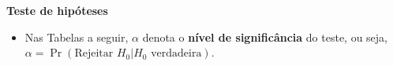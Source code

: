 \documentclass[10pt]{article}%
\renewcommand{\ra}[1]{\renewcommand{\arraystretch}{#1}}
\begin{document}
%
%
%

\textbf{Teste de hipóteses}

\begin{itemize}
\item Nas Tabelas a seguir, $\alpha$ denota o {\bf nível de significância} do teste, ou seja, $\alpha = \Pr(\mbox{Rejeitar } H_0 | H_0 \mbox{ verdadeira})$.
\end{itemize}
\end{document}
